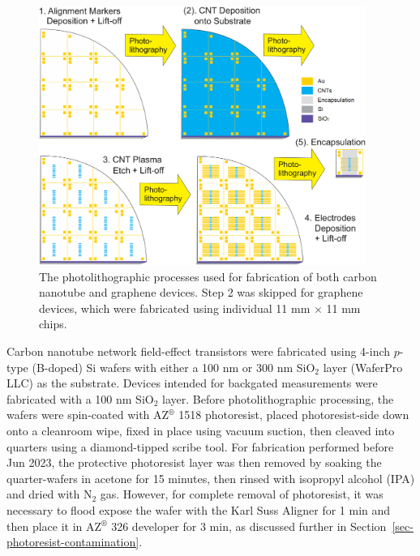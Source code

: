 \documentclass[
  a4paper,
]{scrbook}
\begin{document}
\begin{figure}

{\centering \includegraphics[width=0.95\textwidth,height=\textheight]{figures/ch4/photolithography-cycle.png}

}

\caption[The photolithographic processes used for fabrication of both
carbon nanotube and graphene
devices.]{\label{fig-qw-photolithography}The photolithographic processes
used for fabrication of both carbon nanotube and graphene devices. Step
2 was skipped for graphene devices, which were fabricated using
individual 11 mm \(\times\) 11 mm chips.}

\end{figure}

Carbon nanotube network field-effect transistors were fabricated using
4-inch \(p\)-type (B-doped) Si wafers with either a 100 nm or 300 nm
SiO\(_2\) layer (WaferPro LLC) as the substrate. Devices intended for
backgated measurements were fabricated with a 100 nm SiO\(_2\) layer.
Before photolithographic processing, the wafers were spin-coated with
AZ\(^\circledR\) 1518 photoresist, placed photoresist-side down onto a
cleanroom wipe, fixed in place using vacuum suction, then cleaved into
quarters using a diamond-tipped scribe tool. For fabrication performed
before Jun 2023, the protective photoresist layer was then removed by
soaking the quarter-wafers in acetone for 15 minutes, then rinsed with
isopropyl alcohol (IPA) and dried with N\(_2\) gas. However, for
complete removal of photoresist, it was necessary to flood expose the
wafer with the Karl Suss Aligner for 1 min and then place it in
AZ\(^\circledR\) 326 developer for 3 min, as discussed further in
Section~\ref{sec-photoresist-contamination}.
\end{document}

